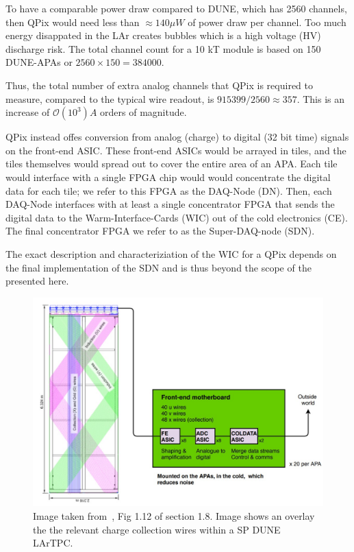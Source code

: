 To have a comparable power draw compared to DUNE, which has 2560 channels, then QPix would need less than $\approx 140 \mu W$ of power draw per channel.
Too much energy disappated in the LAr creates bubbles which is a high voltage (HV) discharge risk.
The total channel count for a 10 kT module is based on 150 DUNE-APAs or $2560\times 150 = 384000$.

Thus, the total number of extra analog channels that QPix is required to measure, compared to the typical wire readout, is $915399 / 2560 \approx 357$.
This is an increase of $\mathcal{O}(10^{3})A$ orders of magnitude.


QPix instead offes conversion from analog (charge) to digital (32 bit time) signals on the front-end ASIC.
These front-end ASICs would be arrayed in tiles, and the tiles themselves would spread out to cover the entire area of an APA.
Each tile would interface with a single FPGA chip would would concentrate the digital data for each tile; we refer to this FPGA as the DAQ-Node (DN).
Then, each DAQ-Node interfaces with at least a single concentrator FPGA that sends the digital data to the Warm-Interface-Cards (WIC) out of the cold electronics (CE).
The final concentrator FPGA we refer to as the Super-DAQ-node (SDN).

The exact description and characteriziation of the WIC for a QPix depends on the final implementation of the SDN and is thus beyond the scope of the presented here.

\begin{figure}[]
\centering
\includegraphics[width=\textwidth]{images/dune_apa_motherboards.jpg}
\caption{Image taken from~\citep{DUNE-FD_TDRv4:Abi_2020}, Fig 1.12 of section 1.8. Image shows an overlay the the relevant charge collection wires within a SP DUNE LArTPC.}
\end{figure}~\label{fig:dune_tpc_electronics}


